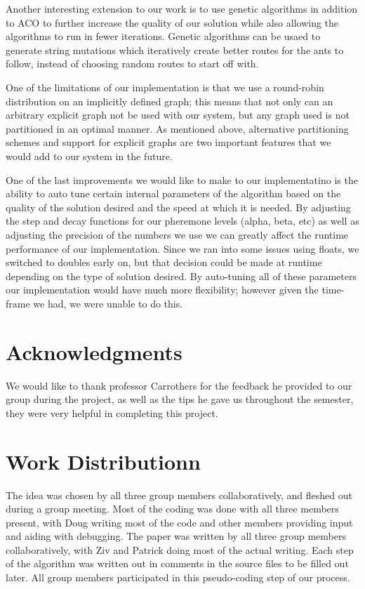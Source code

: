 \documentclass{acm_proc_article-sp}
\begin{document}
Another interesting extension to our work is to use genetic algorithms in addition to ACO to further 
increase the quality of our solution while also allowing the algorithms to run in fewer iterations. Genetic
algorithms can be usaed to generate string mutations which iteratively create better routes for the ants to follow,
instead of choosing random routes to start off with.

One of the limitations of our implementation is that we use a round-robin distribution on an implicitly defined graph; 
this means that not only can an arbitrary explicit graph not be used with our system, but any graph used is not partitioned
in an optimal manner. As mentioned above, alternative partitioning schemes and support for explicit graphs are two important features that we would add to our system in the future.

One of the last improvements we would like to make to our implementatino is the ability to auto tune certain internal parameters
of the algorithm based on the quality of the solution desired and the speed at which it is needed. By adjusting the step and decay functions for our pheremone levels (alpha, beta, etc) as well as adjusting the precision of the numbers we use we can greatly affect the runtime performance of our implementation. Since we ran into some issues using floats, we switched to doubles early on, but that decision could be made at runtime depending on the type of solution desired. By auto-tuning all of these parameters our implementation would have much more flexibility; however given the time-frame we had, we were unable to do this.

\section{Acknowledgments}
We would like to thank professor Carrothers for the feedback he provided to 
our group during the project, as well as the tips he gave us throughout the
semester, they were very helpful in completing this project.

\section{Work Distributionn}
The idea was chosen by all three group members collaboratively, and fleshed out 
during a group meeting. Most of the coding was done with all three members present,
with Doug writing most of the code and other members providing input and aiding with
debugging. The paper was written by all three group members collaboratively, with Ziv
and Patrick doing most of the actual writing. Each step of the algorithm was written out
in comments in the source files to be filled out later. All group members participated in this
pseudo-coding step of our process. 





\balancecolumns
\end{document}
